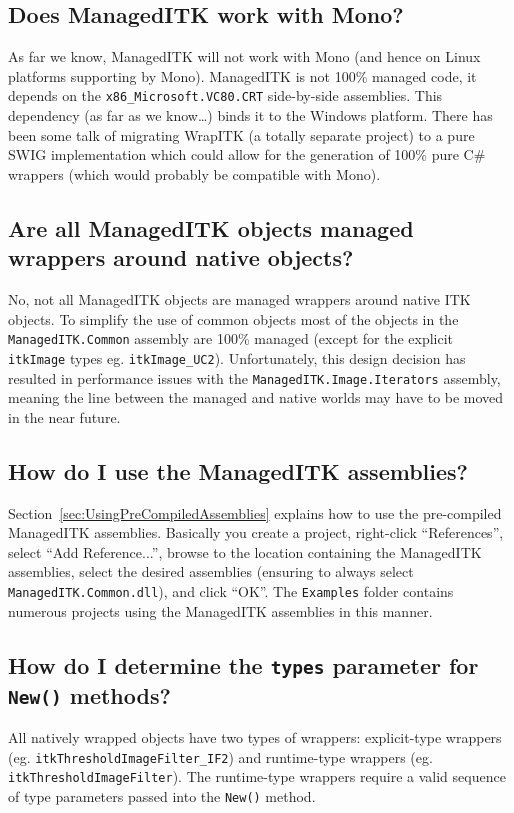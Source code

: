 \documentclass{InsightArticle}
\def\code#1{\texttt{#1}}
\begin{document}
\subsection{Does ManagedITK work with Mono?}
As far we know, ManagedITK will not work with Mono
(and hence on Linux platforms supporting by Mono).
ManagedITK is not 100\% managed code, it depends on the
\code{x86\_Microsoft.VC80.CRT} side-by-side assemblies.
This dependency (as far as we know\ldots) binds it to the Windows platform.
There has been some talk of migrating WrapITK (a totally separate project)
to a pure SWIG implementation which could allow for the generation of 100\% 
pure C\# wrappers (which would probably be compatible with Mono).

\subsection{Are all ManagedITK objects managed wrappers around native objects?}
No, not all ManagedITK objects are managed wrappers around native ITK objects.
To simplify the use of common objects most of the objects in the \code{ManagedITK.Common}
assembly are 100\% managed
(except for the explicit \code{itkImage} types eg. \code{itkImage\_UC2}).
Unfortunately, this design decision has resulted in performance issues with the
\code{ManagedITK.Image.Iterators} assembly, meaning the line between the managed and native
worlds may have to be moved in the near future.

\subsection{How do I use the ManagedITK assemblies?}
Section~\ref{sec:UsingPreCompiledAssemblies} explains how to use the
pre-compiled ManagedITK assemblies.
Basically you create a project, right-click ``References'',
select ``Add Reference...'',
browse to the location containing the ManagedITK assemblies,
select the desired assemblies (ensuring to always select \code{ManagedITK.Common.dll}),
and click ``OK''.
The \code{Examples} folder contains numerous projects using
the ManagedITK assemblies in this manner. 

\subsection{How do I determine the \code{types} parameter for \code{New()} methods?}
All natively wrapped objects have two types of wrappers: explicit-type wrappers
(eg. \code{itkThresholdImageFilter\_IF2}) and runtime-type wrappers
(eg. \code{itkThresholdImageFilter}). 
The runtime-type wrappers require a valid sequence of type parameters passed
into the \code{New()} method.
\end{document}
